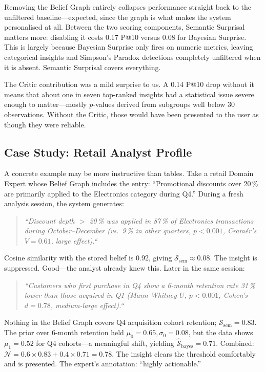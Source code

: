 \documentclass[conference]{IEEEtran}
\begin{document}
Removing the Belief Graph entirely collapses performance straight
back to the unfiltered baseline---expected, since the graph is what
makes the system personalised at all. Between the two scoring
components, Semantic Surprisal matters more: disabling it costs
0.17 P@10 versus 0.08 for Bayesian Surprise. This is largely
because Bayesian Surprise only fires on numeric metrics, leaving
categorical insights and Simpson's Paradox detections completely
unfiltered when it is absent. Semantic Surprisal covers everything.

The Critic contribution was a mild surprise to us. A 0.14 P@10 drop
without it means that about one in seven top-ranked insights had a
statistical issue severe enough to matter---mostly $p$-values derived
from subgroups well below 30 observations. Without the Critic, those
would have been presented to the user as though they were reliable.

\subsection{Case Study: Retail Analyst Profile}

A concrete example may be more instructive than tables. Take a retail
Domain Expert whose Belief Graph includes the entry: ``Promotional
discounts over 20\,\% are primarily applied to the Electronics
category during Q4.'' During a fresh analysis session, the system
generates:

\begin{quote}
  \textit{``Discount depth $>$ 20\,\% was applied in 87\,\% of
  Electronics transactions during October--December (vs.\ 9\,\% in
  other quarters, $p < 0.001$, Cramér's $V = 0.61$, large effect).``}
\end{quote}

Cosine similarity with the stored belief is 0.92, giving
$\mathcal{S}_{\text{sem}} \approx 0.08$. The insight is suppressed.
Good---the analyst already knew this. Later in the same session:

\begin{quote}
  \textit{``Customers who first purchase in Q4 show a 6-month retention
  rate 31\,\% lower than those acquired in Q1 (Mann-Whitney $U$,
  $p < 0.001$, Cohen's $d = 0.78$, medium-large effect).``}
\end{quote}

Nothing in the Belief Graph covers Q4 acquisition cohort retention;
$\mathcal{S}_{\text{sem}} = 0.83$. The prior over 6-month retention
held $\mu_0 = 0.65, \sigma_0 = 0.08$, but the data shows
$\mu_1 = 0.52$ for Q4 cohorts---a meaningful shift, yielding
$\hat{\mathcal{S}}_{\text{bayes}} = 0.71$. Combined:
$\mathcal{N} = 0.6 \times 0.83 + 0.4 \times 0.71 = 0.78$.
The insight clears the threshold comfortably and is presented.
The expert's annotation: ``highly actionable.''
\end{document}
